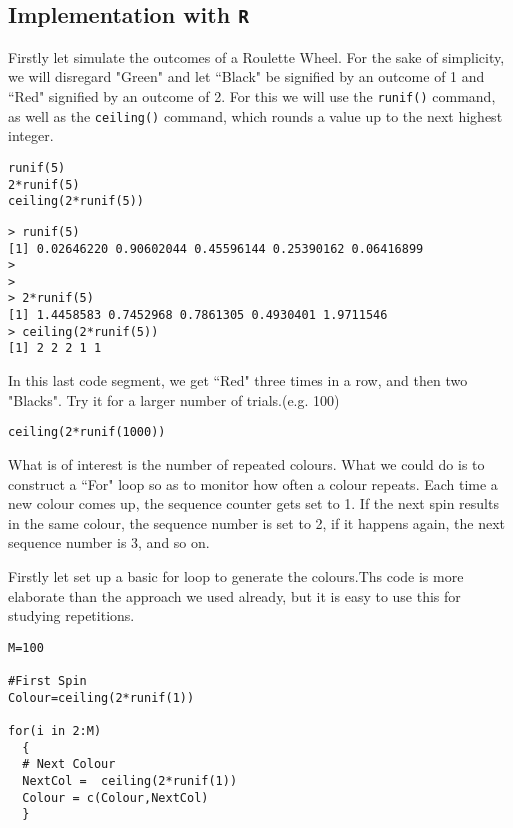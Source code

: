 \documentclass[11pt]{article} %
\begin{document}
\subsection{Implementation with \texttt{R}}
Firstly let simulate the outcomes of a Roulette Wheel. For the sake of simplicity, we will disregard "Green" and let ``Black" be signified by an outcome of 1 and ``Red" signified by an outcome of 2.
For this we will use the \texttt{runif()} command, as well as the \texttt{ceiling()} command, which rounds a value up to the next highest integer.

\begin{framed}
\begin{verbatim}
runif(5)
2*runif(5)
ceiling(2*runif(5))
\end{verbatim}
\end{framed}
\begin{verbatim}
> runif(5)
[1] 0.02646220 0.90602044 0.45596144 0.25390162 0.06416899
> 
> 
> 2*runif(5)
[1] 1.4458583 0.7452968 0.7861305 0.4930401 1.9711546
> ceiling(2*runif(5))
[1] 2 2 2 1 1
\end{verbatim}
In this last code segment, we get ``Red" three times in a row, and  then two "Blacks". Try it for a larger number of trials.(e.g. 100)
\begin{framed}
\begin{verbatim}
ceiling(2*runif(1000))
\end{verbatim}
\end{framed}
What is of interest is the number of repeated colours. What we could do is to construct a ``For" loop so as to monitor how often a colour repeats. Each time a new colour comes up, the sequence counter gets set to 1. If the next spin results in the same colour, the sequence number is set to 2, if it happens again, the next sequence number is 3, and so on.

Firstly let set up a basic for loop to generate the colours.Ths code is more elaborate than the approach we used already, but it is easy to use this for studying repetitions.


\begin{framed}
\begin{verbatim}
M=100

#First Spin
Colour=ceiling(2*runif(1))

for(i in 2:M)
  {
  # Next Colour
  NextCol =  ceiling(2*runif(1))
  Colour = c(Colour,NextCol)
  }
\end{verbatim}
\end{framed}
\end{document}
